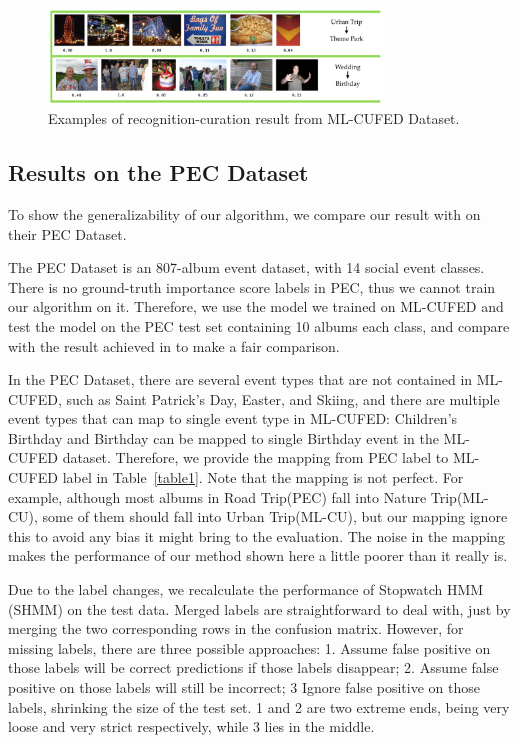 \documentclass[runningheads]{llncs}
\begin{document}
\begin{figure}
\vspace{-0.15in}
\centering
\includegraphics[width=3.5in]{result-cufed}
\caption{Examples of recognition-curation result from ML-CUFED Dataset.}
\label{resultcufed}
\vspace{-0.28in}
\end{figure}


\subsection{Results on the PEC Dataset}
\label{PEC_section}
To show the generalizability of our algorithm, we compare our result with \cite{HMM} on their PEC Dataset.

The PEC Dataset is an 807-album event dataset, with 14 social event classes. There is no ground-truth importance score labels in PEC, thus we cannot train our algorithm on it. Therefore, we use the model we trained on ML-CUFED and test the model on the PEC test set containing 10 albums each class, and compare with the result achieved in \cite{HMM} to make a fair comparison.

In the PEC Dataset, there are several event types that are not contained in ML-CUFED, such as Saint Patrick's Day, Easter, and Skiing, and there are multiple event types that can map to single event type in ML-CUFED: Children's Birthday and Birthday can be mapped to single Birthday event in the ML-CUFED dataset. Therefore, we provide the mapping from PEC label to ML-CUFED label in Table~\ref{table1}. Note that the mapping is not perfect. For example, although most albums in Road Trip(PEC) fall into Nature Trip(ML-CU), some of them should fall into Urban Trip(ML-CU), but our mapping ignore this to avoid any bias it might bring to the evaluation. The noise in the mapping makes the performance of our method shown here a little poorer than it really is.

Due to the label changes, we recalculate the performance of Stopwatch HMM (SHMM) \cite{HMM} on the test data. Merged labels are straightforward to deal with, just by merging the two corresponding rows in the confusion matrix. However, for missing labels, there are three possible approaches: 1. Assume false positive on those labels will be correct predictions if those labels disappear; 2. Assume false positive on those labels will still be incorrect; 3 Ignore false positive on those labels, shrinking the size of the test set. 1 and 2 are two extreme ends, being very loose and very strict respectively, while 3 lies in the middle. 
\end{document}
